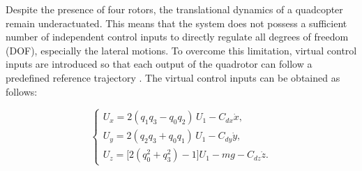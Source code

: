 \begin{small}

Despite the presence of four rotors, the translational dynamics of a quadcopter remain underactuated. 
This means that the system does not possess a sufficient number of independent control inputs to 
directly regulate all degrees of freedom (DOF), especially the lateral motions. To overcome this 
limitation, virtual control inputs are introduced so that each output of the quadrotor can follow a 
predefined reference trajectory \cite{li2018model}. The virtual control inputs can be obtained as follows:


\begin{equation}
\begin{cases}
U_x = 2(q_{1}q_{3} - q_{0}q_{2})\,U_{1} - C_{dx}\dot{x}, \\[8pt]
U_y = 2(q_{2}q_{3} + q_{0}q_{1})\,U_{1} - C_{dy}\dot{y}, \\[8pt]
U_z = \Big[2(q_{0}^{2} + q_{3}^{2}) - 1\Big]U_{1} - m g - C_{dz}\dot{z}.
\end{cases}
\label{eq:virtual control inputs}
\end{equation}









\end{small}
